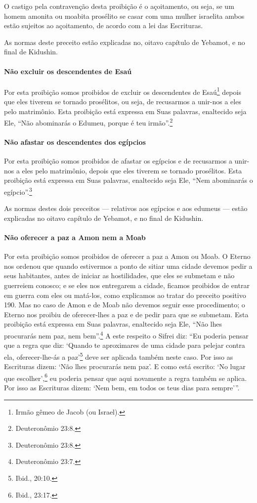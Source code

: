 O castigo pela contravenção desta proibição é o açoitamento, ou seja,
se um homem amonita ou moabita prosélito se casar com uma mulher
israelita ambos estão sujeitos ao açoitamento, de acordo com a lei das
Escrituras.

As normas deste preceito estão explicadas no, oitavo capítulo de
Yebamot, e no final de Kidushin.


\paragraph{Não excluir os descendentes de Esaú}

Por esta proibição somos proibidos de excluir os descendentes de
Esaú\footnote{Irmão gêmeo de Jacob (ou Israel).} depois que eles tiverem se tornado
prosélitos, ou seja, de recusarmos a unir-nos a eles pelo matrimônio.
Esta proibição está expressa em Suas palavras, enaltecido seja Ele,
``Não abominarás o Edumeu, porque é teu irmão''.\footnote{Deuteronômio 23:8.}

\paragraph{Não afastar os descendentes dos egípcios}

Por esta proibição somos proibidos de afastar os egípcios e de
recusarmos a unir-nos a eles pelo matrimônio, depois que eles tiverem se
tornado prosélitos. Esta proibição está expressa em Suas palavras,
enaltecido seja Ele, ``Nem abominarás o egípcio''.\footnote{Deuteronômio 23:8.}

As normas destes dois preceitos --- relativos aos egípcios e aos edumeus
--- estão explicadas no oitavo capítulo de Yebamot, e no final de
Kidushin.

\paragraph{Não oferecer a paz a Amon nem a Moab}

Por esta proibição somos proibidos de oferecer a paz a Amon ou Moab. O
Eterno nos ordenou que quando estivermos a ponto de sitiar uma cidade
devemos pedir a seus habitantes, antes de iniciar as hostilidades, que
eles se submetam e não guerreiem conosco; e se eles nos entregarem a
cidade, ficamos proibidos de entrar em guerra com eles ou matá-los,
como explicamos ao tratar do preceito positivo 190. Mas no caso de Amon
e de Moab não devemos seguir esse procedimento; o Eterno nos proibiu de
oferecer-lhes a paz e de pedir para que se submetam. Esta proibição
está expressa em Suas palavras, enaltecido seja Ele, ``Não lhes
procurarás nem paz, nem bem''.\footnote{Deuteronômio 23:7.} A este respeito o
Sifrei diz: ``Eu poderia pensar que a regra que diz: `Quando te
aproximares de uma cidade para pelejar contra ela, oferecer-lhe-ás a
paz'\footnote{Ibid., 20:10.} deve ser aplicada também neste caso. Por isso as
Escrituras dizem: `Não lhes procurarás nem paz'. E como está escrito:
`No lugar que escolher',\footnote{Ibid., 23:17.} eu poderia pensar que aqui
novamente a regra também se aplica. Por isso as Escrituras dizem: `Nem
bem, em todos os teus dias para sempre'''.

